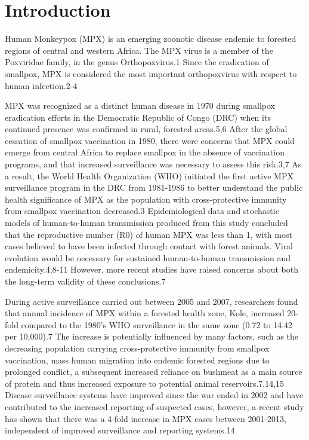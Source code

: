 \section{Introduction}
Human Monkeypox (MPX) is an emerging zoonotic disease endemic to forested regions of central and western Africa. The MPX virus is a member of the Poxviridae family, in the genus Orthopoxvirus.1 Since the eradication of smallpox, MPX is considered the most important orthopoxvirus with respect to human infection.2-4 

MPX was recognized as a distinct human disease in 1970 during smallpox eradication efforts in the Democratic Republic of Congo (DRC) when its continued presence was confirmed in rural, forested areas.5,6 After the global cessation of smallpox vaccination in 1980, there were concerns that MPX could emerge from central Africa to replace smallpox in the absence of vaccination programs, and that increased surveillance was necessary to assess this risk.3,7 As a result, the World Health Organization (WHO) initiated the first active MPX surveillance program in the DRC from 1981-1986 to better understand the public health significance of MPX as the population with cross-protective immunity from smallpox vaccination decreased.3 Epidemiological data and stochastic models of human-to-human transmission produced from this study concluded that the reproductive number (R0) of human MPX was less than 1, with most cases believed to have been infected through contact with forest animals. Viral evolution would be necessary for sustained human-to-human transmission and endemicity.4,8-11 However, more recent studies have raised concerns about both the long-term validity of these conclusions.7 

During active surveillance carried out between 2005 and 2007, researchers found that annual incidence of MPX within a forested health zone, Kole, increased 20-fold compared to the 1980’s WHO surveillance in the same zone (0.72 to 14.42 per 10,000).7 The increase is potentially influenced by many factors, such as the decreasing population carrying cross-protective immunity from smallpox vaccination, mass human migration into endemic forested regions due to prolonged conflict, a subsequent increased reliance on bushmeat as a main source of protein and thus increased exposure to potential animal reservoirs.7,14,15 Disease surveillance systems have improved since the war ended in 2002 and have contributed to the increased reporting of suspected cases, however, a recent study has shown that there was a 4-fold increase in MPX cases between 2001-2013, independent of improved surveillance and reporting systems.14 

